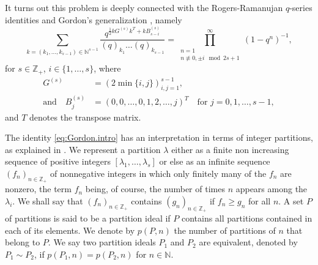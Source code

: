 \documentclass[a4paper, 12pt, reqno]{amsart}
\theoremstyle{remark}
\begin{document}
It turns out this problem is deeply connected with the Rogers-Ramanujan $q$-series identities and Gordon's generalization \cite{gordon_combinatorial_1961}, namely
\begin{equation}\label{eq:Gordon.intro}
  \sum_{k = (k_1, \dots, k_{s - 1}) \in \mathbb{N}^{s - 1}}  \frac{q^{\frac{1}{2}kG^{(s)}k^T + kB^{(s)}_{s - i}}}{(q)_{k_1}\dots(q)_{k_{s - 1}}} = \prod^{\infty}_{\substack{n = 1 \\ n \not\equiv 0, \pm i \mod 2s + 1}}(1 - q^n)^{-1},
\end{equation}
for $s \in \mathbb{Z}_+$, $i \in \{1, \dots, s\}$, where
\begin{align*}
  G^{(s)} &= (2\min\{i, j\})_{i, j = 1}^{s - 1}, \\
\text{and} \quad  B^{(s)}_j &=
              \left(0, 0, \ldots, 0, 1, 2, \ldots, j\right)^T \quad \text{for $j = 0, 1, \dots, s - 1$},
\end{align*}
and $T$ denotes the transpose matrix.

The identity \eqref{eq:Gordon.intro} has an interpretation in terms of integer partitions, as explained in \cite[\S8]{andrews_theory_1998}. We represent a partition $\lambda$ either as a finite non increasing sequence of positive integers $[\lambda_1, \dots, \lambda_s]$ or else as an infinite sequence $(f_n)_{n \in \mathbb{Z}_+}$ of nonnegative integers in which only finitely many of the $f_n$ are nonzero, the term $f_n$ being, of course, the number of times $n$ appears among the $\lambda_i$. We shall say that $(f_n)_{n \in \mathbb{Z}_+}$ contains $(g_n)_{n \in \mathbb{Z}_+}$ if $f_n \geq g_n$ for all $n$. A set $P$ of partitions is said to be a partition ideal if $P$ contains all partitions contained in each of its elements. We denote by $p(P, n)$ the number of partitions of $n$ that belong to $P$.
We say two partition ideals $P_1$ and $P_2$ are equivalent, denoted by $P_1 \sim P_2$, if $p(P_1, n) = p(P_2, n)$ for $n \in \mathbb{N}$.
\end{document}
